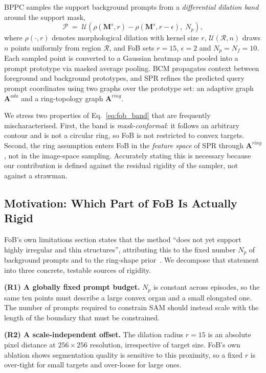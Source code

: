BPPC samples the support background prompts from a \emph{differential dilation
band} around the support mask,
\begin{equation}
  \mathcal{P} \;=\; \mathcal{U}\!\left(\rho(\mathbf{M}^{s},r) - \rho(\mathbf{M}^{s},r-\epsilon),\; N_{p}\right),
  \label{eq:fob_band}
\end{equation}
where $\rho(\cdot,r)$ denotes morphological dilation with kernel size $r$,
$\mathcal{U}(\mathcal{R},n)$ draws $n$ points uniformly from region
$\mathcal{R}$, and FoB sets $r{=}15$, $\epsilon{=}2$ and $N_{p}{=}N_{f}{=}10$.
Each sampled point is converted to a Gaussian heatmap and pooled into a prompt
prototype via masked average pooling. BCM propagates context between foreground
and background prototypes, and SPR refines the predicted query prompt
coordinates using two graphs over the prototype set: an adaptive graph
$\mathbf{A}^{ada}$ and a ring-topology graph $\mathbf{A}^{ring}$.

We stress two properties of Eq.~\eqref{eq:fob_band} that are frequently
mischaracterised. First, the band is \emph{mask-conformal}: it follows an
arbitrary contour and is not a circular ring, so FoB is not restricted to
convex targets. Second, the ring assumption enters FoB in the \emph{feature
space} of SPR through $\mathbf{A}^{ring}$, not in the image-space sampling.
Accurately stating this is necessary because our contribution is defined
against the residual rigidity of the sampler, not against a strawman.

\subsection{Motivation: Which Part of FoB Is Actually Rigid}
\label{subsec:motivation}

FoB's own limitations section states that the method ``does not yet support
highly irregular and thin structures'', attributing this to the fixed number
$N_{p}$ of background prompts and to the ring-shape prior~\cite{bo2026fob}. We
decompose that statement into three concrete, testable sources of rigidity.

\textbf{(R1) A globally fixed prompt budget.} $N_{p}$ is constant across
episodes, so the same ten points must describe a large convex organ and a small
elongated one. The number of prompts required to constrain SAM should instead
scale with the length of the boundary that must be constrained.

\textbf{(R2) A scale-independent offset.} The dilation radius $r{=}15$ is an
absolute pixel distance at $256\times256$ resolution, irrespective of target
size. FoB's own ablation shows segmentation quality is sensitive to this
proximity, so a fixed $r$ is over-tight for small targets and over-loose for
large ones.

